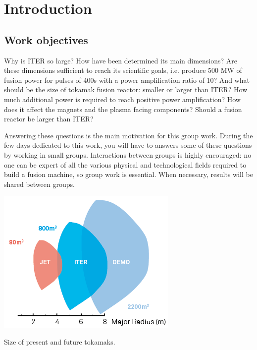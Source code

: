 \chapter{Introduction}
\margintoc
\section{Work objectives}
Why is ITER so large? How have been determined its main dimensions? Are these dimensions sufficient to reach its scientific goals,  i.e. produce 500 MW of fusion power for pulses of 400s with a power amplification ratio of 10? And what should be the size of tokamak fusion reactor: smaller or larger than ITER? How much additional power is required to reach positive power amplification? How does it affect the magnets and the plasma facing components? Should a fusion reactor be larger than ITER?

Answering these questions is the main motivation for this group work. During the few days dedicated to this work, you will have to answers some of these questions by working in small groups. Interactions between groups is highly encouraged: no one can be expert of all the various physical and technological fields required to build a fusion machine, so group work is essential. When necessary, results will be shared between groups.

\begin{marginfigure}[-3.8cm]
	\centering
	\includegraphics[width=1\linewidth]{figures/size_JET_ITER_DEMO}
	\caption{Size of present and future tokamaks.}
	\label{fig:sizejetiterdemo}
\end{marginfigure}

